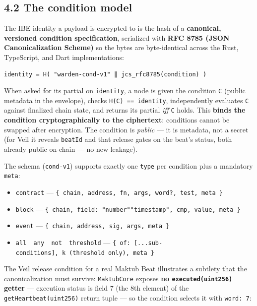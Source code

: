 \documentclass[
  11pt,
]{article}
\providecommand{\tightlist}{%
  \setlength{\itemsep}{0pt}\setlength{\parskip}{0pt}}
\begin{document}
\subsection{4.2 The condition model}\label{the-condition-model}

The IBE identity a payload is encrypted to is the hash of a
\textbf{canonical, versioned condition specification}, serialized with
\textbf{RFC 8785 (JSON Canonicalization Scheme)} so the bytes are
byte-identical across the Rust, TypeScript, and Dart implementations:

\begin{verbatim}
identity = H( "warden-cond-v1" ‖ jcs_rfc8785(condition) )
\end{verbatim}

When asked for its partial on \texttt{identity}, a node is given the
condition \texttt{C} (public metadata in the envelope), checks
\texttt{H(C)\ ==\ identity}, independently evaluates \texttt{C} against
finalized chain state, and returns its partial \emph{iff} \texttt{C}
holds. This \textbf{binds the condition cryptographically to the
ciphertext}: conditions cannot be swapped after encryption. The
condition is \emph{public} --- it is metadata, not a secret (for Veil it
reveals \texttt{beatId} and that release gates on the beat's status,
both already public on-chain --- no new leakage).

The schema (\texttt{cond-v1}) supports exactly one \texttt{type} per
condition plus a mandatory \texttt{meta}:

\begin{itemize}
\tightlist
\item
  \texttt{contract} ---
  \texttt{\{\ chain,\ address,\ fn,\ args,\ word?,\ test,\ meta\ \}}
\item
  \texttt{block} ---
  \texttt{\{\ chain,\ field:\ "number"\textbar{}"timestamp",\ cmp,\ value,\ meta\ \}}
\item
  \texttt{event} ---
  \texttt{\{\ chain,\ address,\ sig,\ args,\ meta\ \}}
\item
  \texttt{all\ \textbar{}\ any\ \textbar{}\ not\ \textbar{}\ threshold}
  ---
  \texttt{\{\ of:\ {[}...sub-conditions{]},\ k\ (threshold\ only),\ meta\ \}}
\end{itemize}

The Veil release condition for a real Maktub Beat illustrates a subtlety
that the canonicalization must survive: \texttt{MaktubCore} exposes
\textbf{no \texttt{executed(uint256)} getter} --- execution status is
field 7 (the 8th element) of the \texttt{getHeartbeat(uint256)} return
tuple --- so the condition selects it with \texttt{word:\ 7}:
\end{document}
